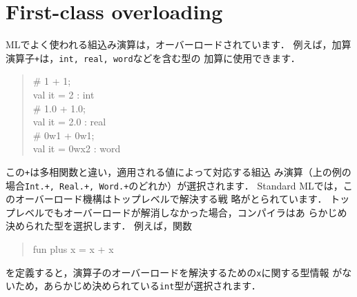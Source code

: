 \documentclass{jbook}
\newif\ifjp
\newcommand{\txt}[2]{#2}
\begin{document}
\section{
\txt{第一級オーバーローディング}
    {First-class overloading}
}
\label{sec:extensionOverloading}

\ifjp%
	MLでよく使われる組込み演算は，オーバーロードされています．
	例えば，加算演算子{\tt +}は，{\tt int, real, word}などを含む型の
加算に使用できます．
\begin{tt}
\begin{quote}
\# 1 + 1;\\
val it = 2 : int\\
\# 1.0 + 1.0;\\
val it = 2.0 : real\\
\# 0w1 + 0w1;\\
val it = 0wx2 : word
\end{quote}
\end{tt}
	この{\tt +}は多相関数と違い，適用される値によって対応する組込
み演算（上の例の場合{\tt Int.+, Real.+, Word.+}のどれか）が選択されます．
	Standard MLでは，このオーバーロード機構はトップレベルで解決する戦
略がとられています．
	トップレベルでもオーバーロードが解消しなかった場合，コンパイラはあ
らかじめ決められた型を選択します．
	例えば，関数
\begin{tt}
\begin{quote}
fun plus x = x + x
\end{quote}
\end{tt}
を定義すると，演算子のオーバーロードを解決するための{\tt x}に関する型情報
がないため，あらかじめ決められている{\tt int}型が選択されます．
	
\end{document}
